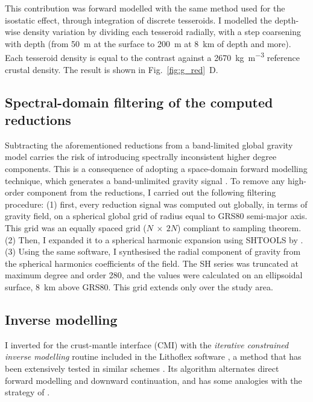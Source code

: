 This contribution was forward modelled with the same method used for the isostatic effect, through integration of discrete tesseroids.
I modelled the depth-wise density variation by dividing each tesseroid radially, with a step coarsening with depth (from 50~m at the surface to 200~m at 8~\si{\kilo \metre} of depth and more).
Each tesseroid density is equal to the contrast against a 2670~\si{\kilo \gram \per \cubic \metre} reference crustal density.
The result is shown in Fig.~\ref{fig:g_red}~D.

\subsection{Spectral-domain filtering of the computed reductions}
\label{ss:Appl:GravSpectralFiltering}
Subtracting the aforementioned reductions from a band-limited global gravity model carries the risk of introducing spectrally inconsistent higher degree components.
This is a consequence of adopting a space-domain forward modelling technique, which generates a band-unlimited gravity signal \parencite{Hirt2014}.
To remove any high-order component from the reductions, I carried out the following filtering procedure:
(1) first, every reduction signal was computed out globally, in terms of gravity field, on a spherical global grid of radius equal to {GRS80} semi-major axis.
This grid was an equally spaced grid ($N~\times~2N$) compliant to \textcite{Driscoll1994} sampling theorem.
(2) Then, I expanded it to a spherical harmonic expansion using {SHTOOLS} by \textcite{Wieczorek2018}. \nocite{SHTOOLS43Wieczorek2018}
(3) Using the same software, I synthesised the radial component of gravity from the spherical harmonics coefficients of the field. The SH series was truncated at maximum degree and order 280, and the values were calculated on an ellipsoidal surface, 8~\si{\kilo \metre} above GRS80.
This grid extends only over the study area.

\subsection{Inverse modelling}
\label{ss:Appl:GravInv}
I inverted for the crust-mantle interface (CMI) with the \textit{iterative constrained inverse modelling} routine included in the Lithoflex software \parencite{Braitenberg2007}, a method that has been extensively tested in similar schemes \parencites{Ebbing2001}{Mariani2013}.
Its algorithm alternates direct forward modelling and downward continuation, and has some analogies with the strategy of \textcite{Oldenburg1974}.

